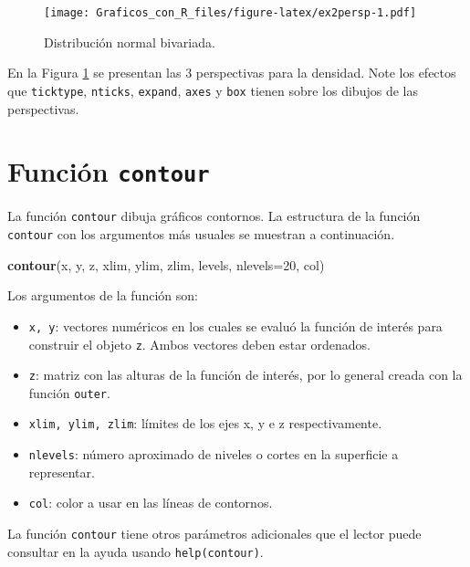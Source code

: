 \documentclass[10pt,]{krantz}
\makeatletter
\newenvironment{Shaded}{\begin{snugshade}}{\end{snugshade}}
\newcommand{\KeywordTok}[1]{\textcolor[rgb]{0.13,0.29,0.53}{\textbf{{#1}}}}
\newcommand{\DataTypeTok}[1]{\textcolor[rgb]{0.13,0.29,0.53}{{#1}}}
\newcommand{\DecValTok}[1]{\textcolor[rgb]{0.00,0.00,0.81}{{#1}}}
\newcommand{\NormalTok}[1]{{#1}}
\providecommand{\tightlist}{%
  \setlength{\itemsep}{0pt}\setlength{\parskip}{0pt}}
\newenvironment{kframe}{%
\medskip{}
\setlength{\fboxsep}{.8em}
 \def\at@end@of@kframe{}%
 \ifinner\ifhmode%
  \def\at@end@of@kframe{\end{minipage}}%
  \begin{minipage}{\columnwidth}%
 \fi\fi%
 \def\FrameCommand##1{\hskip\@totalleftmargin \hskip-\fboxsep
 \colorbox{shadecolor}{##1}\hskip-\fboxsep
     \hskip-\linewidth \hskip-\@totalleftmargin \hskip\columnwidth}%
 \MakeFramed {\advance\hsize-\width
   \@totalleftmargin\z@ \linewidth\hsize
   \@setminipage}}%
 {\par\unskip\endMakeFramed%
 \at@end@of@kframe}
\renewenvironment{Shaded}{\begin{kframe}}{\end{kframe}}
\makeatother
\begin{document}
\begin{figure}[htbp]
\centering
\texttt{[image: Graficos\_con\_R\_files/figure-latex/ex2persp-1.pdf]}
\caption{\label{fig:ex2persp}Distribución normal bivariada.}
\end{figure}

En la Figura \ref{fig:ex2persp} se presentan las 3 perspectivas para la
densidad. Note los efectos que \texttt{ticktype}, \texttt{nticks},
\texttt{expand}, \texttt{axes} y \texttt{box} tienen sobre los dibujos
de las perspectivas.

\section{\texorpdfstring{Función \texttt{contour} 
}{Función contour  }}\label{funcion-contour}

La función \texttt{contour} dibuja gráficos contornos. La estructura de
la función \texttt{contour} con los argumentos más usuales se muestran a
continuación.

\begin{Shaded}
\begin{Highlighting}[]
\KeywordTok{contour}\NormalTok{(x, y, z,}
        \NormalTok{xlim, ylim, zlim,}
        \NormalTok{levels, }\DataTypeTok{nlevels=}\DecValTok{20}\NormalTok{, col)}
\end{Highlighting}
\end{Shaded}

Los argumentos de la función son:

\begin{itemize}
\tightlist
\item
  \texttt{x,\ y}: vectores numéricos en los cuales se evaluó la función
  de interés para construir el objeto \texttt{z}. Ambos vectores deben
  estar ordenados.
\item
  \texttt{z}: matriz con las alturas de la función de interés, por lo
  general creada con la función \texttt{outer}.
\item
  \texttt{xlim,\ ylim,\ zlim}: límites de los ejes x, y e z
  respectivamente.
\item
  \texttt{nlevels}: número aproximado de niveles o cortes en la
  superficie a representar.
\item
  \texttt{col}: color a usar en las líneas de contornos.
\end{itemize}

La función \texttt{contour} tiene otros parámetros adicionales que el
lector puede consultar en la ayuda usando \texttt{help(contour)}.
\end{document}
